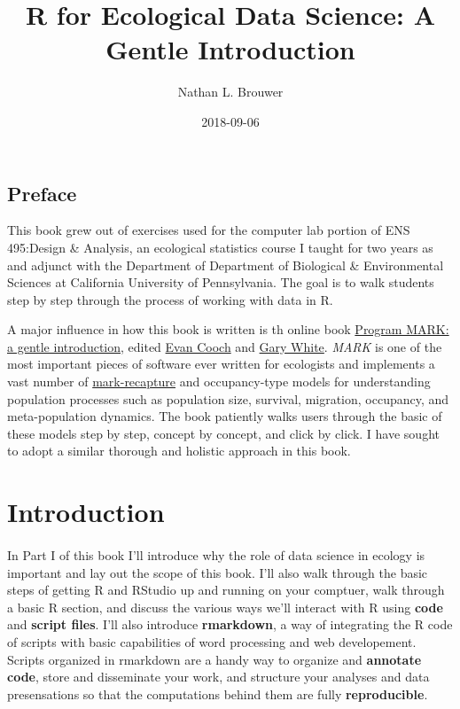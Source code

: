 \documentclass[]{book}
\title{R for Ecological Data Science: A Gentle Introduction}
\author{Nathan L. Brouwer}
\date{2018-09-06}
\theoremstyle{definition}
\theoremstyle{definition}
\theoremstyle{definition}
\theoremstyle{remark}
\begin{document}
\maketitle

{
\setcounter{tocdepth}{1}
\tableofcontents
}
\chapter*{Preface}\label{preface}

This book grew out of exercises used for the computer lab portion of ENS
495:Design \& Analysis, an ecological statistics course I taught for two
years as and adjunct with the Department of Department of Biological \&
Environmental Sciences at California University of Pennsylvania. The
goal is to walk students step by step through the process of working
with data in R.

A major influence in how this book is written is th online book
\href{http://www.phidot.org/software/mark/docs/book/}{Program MARK: a
gentle introduction}, edited \href{http://canuck.dnr.cornell.edu/}{Evan
Cooch} and \href{https://sites.warnercnr.colostate.edu/gwhite/}{Gary
White}. \emph{MARK} is one of the most important pieces of software ever
written for ecologists and implements a vast number of
\href{https://en.wikipedia.org/wiki/Mark_and_recapture}{mark-recapture}
and occupancy-type models for understanding population processes such as
population size, survival, migration, occupancy, and meta-population
dynamics. The book patiently walks users through the basic of these
models step by step, concept by concept, and click by click. I have
sought to adopt a similar thorough and holistic approach in this book.

\part{Introduction}\label{part-introduction}

\subsection*{}\label{section}

In Part I of this book I'll introduce why the role of data science in
ecology is important and lay out the scope of this book. I'll also walk
through the basic steps of getting R and RStudio up and running on your
comptuer, walk through a basic R section, and discuss the various ways
we'll interact with R using \textbf{code} and \textbf{script files}.
I'll also introduce \textbf{rmarkdown}, a way of integrating the R code
of scripts with basic capabilities of word processing and web
developement. Scripts organized in rmarkdown are a handy way to organize
and \textbf{annotate code}, store and disseminate your work, and
structure your analyses and data presensations so that the computations
behind them are fully \textbf{reproducible}.
\end{document}
